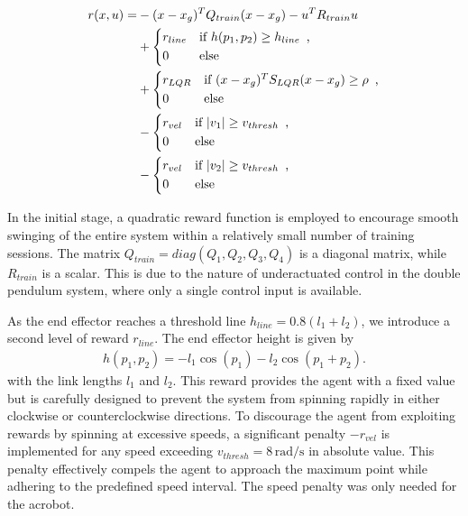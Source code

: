 \begin{equation}
\begin{aligned}
 r(x,u) = &-(x - x_g)^T Q_{train} (x - x_g) - u^T R_{train}u \nonumber\\
           & +
            \begin{dcases*}
              r_{line} & \text{if} $h(p_1, p_2) \geq h_{line}$\, ,\\
              0 & \text{else}
            \end{dcases*}\nonumber\\
           & +
            \begin{dcases*}
              r_{LQR} & \text{if} $(x - x_g)^T S_{LQR} (x - x_g) \geq \rho $\, ,\\
              0 & \text{else}
            \end{dcases*}\nonumber\\
           & -
            \begin{dcases*}
              r_{vel} & \text{if} $|v_1| \geq v_{thresh}$\, ,\\
              0 & \text{else}
            \end{dcases*}\nonumber\\
           & -
            \begin{dcases*}
              r_{vel} & \text{if} $|v_2| \geq v_{thresh}$\, ,\\
              0 & \text{else}
            \end{dcases*}
\end{aligned}
\end{equation}

In the initial stage, a quadratic reward function is employed to encourage
smooth swinging of the entire system within a relatively small number of
training sessions. The matrix  \(Q_{train} = diag(Q_1, Q_2, Q_3, Q_4)\) is a
diagonal matrix, while \(R_{train}\) is a scalar. This is due to the nature
of underactuated control in the double pendulum system, where only a single
control input is available.

As the end effector reaches a threshold line \(h_{line} = 0.8(l_1+l_2)\), we
introduce a second level of reward \(r_{line}\). The end effector height is
given by
\begin{align}
    h(p_1, p_2) = -l_1\cos(p_1) - l_2 \cos(p_1 + p_2).
\end{align}
with the link lengths $l_1$ and $l_2$.
This reward provides the agent with a fixed value
but is carefully designed to prevent the system from spinning rapidly in either
clockwise or counterclockwise directions. To discourage the agent from
exploiting rewards by spinning at excessive speeds, a significant penalty
\(-r_{vel}\) is implemented for any speed exceeding $v_{thresh}=8\,
\text{rad}/\text{s}$ in absolute value.
This penalty effectively compels the agent to approach the maximum point while
adhering to the predefined speed interval. The speed penalty was only needed for
the acrobot.

